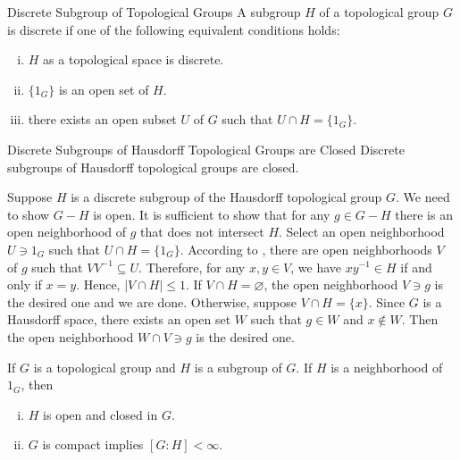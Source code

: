 \documentclass{report}
\begin{document}
\begin{definition}{Discrete Subgroup of Topological Groups}{}
	A subgroup $H$ of a topological group $G$ is {discrete} if one of the following equivalent conditions holds:
	\begin{enumerate}[(i)]
		\item $H$ as a topological space is discrete.
		\item $\{1_G\}$ is an open set of $H$.
		\item there exists an open subset $U$ of $G$ such that $U\cap H=\{1_G\}$.
	\end{enumerate}

\end{definition}

\begin{proposition}{Discrete Subgroups of Hausdorff Topological Groups are Closed}{}
	Discrete subgroups of Hausdorff topological groups are closed.
\end{proposition}
\begin{prf}
	Suppose $H$ is a discrete subgroup of the Hausdorff topological group $G$. We need to show $G-H$ is open. It is sufficient to show that for any $g \in G-H$ there is an open neighborhood of $g$ that does not intersect $H$. Select an open neighborhood $U \ni 1_G$ such that $U \cap H=\{1_G\}$. According to , there are open neighborhoods $V$ of $g$ such that $VV^{-1}\subseteq U$. Therefore, for any $x, y \in V$, we have $x y^{-1} \in H$ if and only if $x=y$. Hence, $|V \cap H| \leq 1$. If $V \cap H=\varnothing$, the open neighborhood $V\ni g$ is the desired one and we are done. Otherwise, suppose $V \cap H=\{x\}$. Since $G$ is a Hausdorff space, there exists an open set $W$ such that $g \in W$ and $x \notin W$. Then the open neighborhood $W \cap V \ni g$ is the desired one.
\end{prf}

\begin{proposition}{}{}
	If $G$ is a topological group and $H$ is a subgroup of $G$. If $H$ is a neighborhood of $1_G$, then 
	\begin{enumerate}[(i)]
		\item $H$ is open and closed in $G$.
		\item $G$ is compact implies $[G:H]<\infty$.
	\end{enumerate}
\end{proposition}
\end{document}

